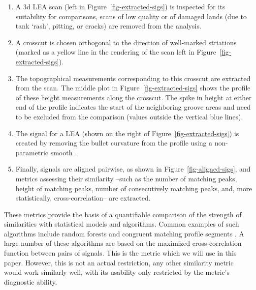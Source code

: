 \documentclass[
  12pt]{article}
\begin{document}
\begin{enumerate}
\def\labelenumi{\arabic{enumi}.}
\item
  A 3d LEA scan (left in Figure~\ref{fig-extracted-sigs}) is inspected
  for its suitability for comparisons, scans of low quality or of
  damaged lands (due to tank `rash', pitting, or cracks) are removed
  from the analysis.
\item
  A crosscut is chosen orthogonal to the direction of well-marked
  striations (marked as a yellow line in the rendering of the scan left
  in Figure~\ref{fig-extracted-sigs}).
\item
  The topographical measurements corresponding to this crosscut are
  extracted from the scan. The middle plot in
  Figure~\ref{fig-extracted-sigs} shows the profile of these height
  measurements along the crosscut. The spike in height at either end of
  the profile indicates the start of the neighboring groove areas and
  need to be excluded from the comparison (values outside the vertical
  blue lines).
\item
  The signal for a LEA (shown on the right of
  Figure~\ref{fig-extracted-sigs}) is created by removing the bullet
  curvature from the profile using a non-parametric smooth
  \citep{clevelandRobustLocallyWeighted1979}.
\item
  Finally, signals are aligned pairwise, as shown in
  Figure~\ref{fig-aligned-sigs}, and metrics assessing their similarity
  --such as the number of matching peaks, height of matching peaks,
  number of consecutively matching peaks, and, more statistically,
  cross-correlation-- are extracted.
\end{enumerate}

These metrics provide the basis of a quantifiable comparison of the
strength of similarities with statistical models and algorithms. Common
examples of such algorithms include random forests
\citep{hofmannBulletxtrctrAutomaticMatching2022} and congruent matching
profile segments
\citep{chenFiredBulletSignature2019, juOpenSourceImplementationCMPS2022}.
A large number of these algorithms are based on the maximized
cross-correlation function between pairs of signals. This is the metric
which we will use in this paper. However, this is not an actual
restriction, any other similarity metric would work similarly well, with
its usability only restricted by the metric's diagnostic ability.
\end{document}
